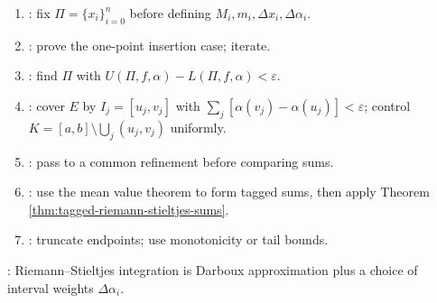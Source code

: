 \begin{method} \label{meth:riemann-stieltjes-no-overlap-source-todo}\label{meth:riemann-stieltjes-proof-patterns} 
\begin{enumerate}[label=(\roman*)]
\setlength{\itemsep}{0pt}
\item {}: fix $\Pi=\{x_i\}_{i=0}^n$ before defining $M_i,m_i,\Delta x_i,\Delta\alpha_i$.
\item {}: prove the one-point insertion case; iterate.
\item {}: find $\Pi$ with $U(\Pi,f,\alpha)-L(\Pi,f,\alpha)<\varepsilon$.
\item {}: cover $E$ by $I_j=[u_j,v_j]$ with $\sum_j[\alpha(v_j)-\alpha(u_j)]<\varepsilon$; control $K=[a,b]\setminus\bigcup_j(u_j,v_j)$ uniformly.
\item {}: pass to a common refinement before comparing sums.
\item {}: use the mean value theorem to form tagged sums, then apply Theorem \ref{thm:tagged-riemann-stieltjes-sums}.
\item {}: truncate endpoints; use monotonicity or tail bounds.
\end{enumerate}
: Riemann--Stieltjes integration is Darboux approximation plus a choice of interval weights $\Delta\alpha_i$.
\end{method}
